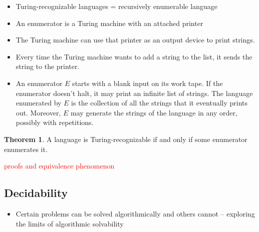 \documentclass[11pt]{article}
\theoremstyle{definition}
\newtheorem{thm}{Theorem}[section]
\newcommand{\todo}{\textcolor{red}}
\begin{document}
\begin{itemize}[leftmargin=*]
    \item Turing-recognizable languages = recursively enumerable language
    \item An enumerator is a Turing machine with an attached printer
    \item The Turing machine can use that printer as an output device to print strings. 
    \item Every time the Turing machine wants to add a string to the list, it sends the string to the printer.
    \item An enumerator $E$ starts with a blank input on its work tape. If the enumerator doesn't halt, it may print an infinite list of strings. The language enumerated by $E$ is the collection of all the strings that it eventually prints out. Moreover, $E$ may generate the strings of the language in any order, possibly with repetitions.
\end{itemize}
\begin{thm}
    A language is Turing-recognizable if and only if some enumerator enumerates it.
\end{thm}
\todo{proofs and equivalence phenomenon}


\subsection{Decidability}
\begin{itemize}[leftmargin=*]
    \item Certain problems can be solved algorithmically and others cannot -- exploring the limits of algorithmic solvability
\end{itemize}
\end{document}
